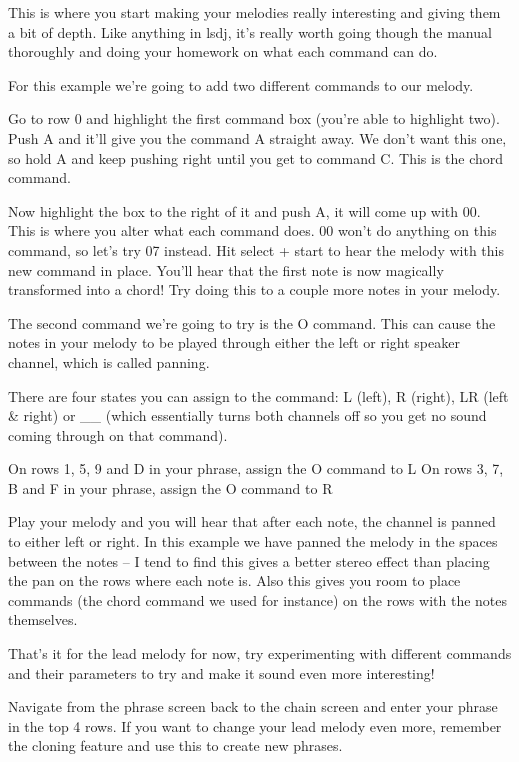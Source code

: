 \documentclass[]{article}
\begin{document}
This is where you start making your melodies really interesting and giving them a bit of depth. Like anything in lsdj, it’s really worth going though the manual thoroughly and doing your homework on what each command can do.

For this example we’re going to add two different commands to our melody.

Go to row 0 and highlight the first command box (you’re able to highlight two). Push A and it’ll give you the command A straight away. We don’t want this one, so hold A and keep pushing right until you get to command C. This is the chord command.

Now highlight the box to the right of it and push A, it will come up with 00. This is where you alter what each command does. 00 won’t do anything on this command, so let’s try 07 instead. Hit select + start to hear the melody with this new command in place. You’ll hear that the first note is now magically transformed into a chord! Try doing this to a couple more notes in your melody.

The second command we’re going to try is the O command. This can cause the notes in your melody to be played through either the left or right speaker channel, which is called panning.

There are four states you can assign to the command: L (left), R (right), LR (left \& right) or \_\_ (which essentially turns both channels off so you get no sound coming through on that command).

On rows 1, 5, 9 and D in your phrase, assign the O command to L On rows 3, 7, B and F in your phrase, assign the O command to R

Play your melody and you will hear that after each note, the channel is panned to either left or right. In this example we have panned the melody in the spaces between the notes – I tend to find this gives a better stereo effect than placing the pan on the rows where each note is. Also this gives you room to place commands (the chord command we used for instance) on the rows with the notes themselves.

That’s it for the lead melody for now, try experimenting with different commands and their parameters to try and make it sound even more interesting!

Navigate from the phrase screen back to the chain screen and enter your phrase in the top 4 rows. If you want to change your lead melody even more, remember the cloning feature and use this to create new phrases.
\end{document}
